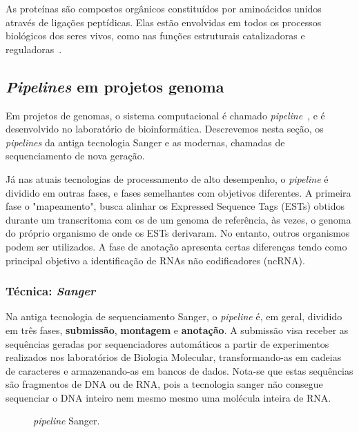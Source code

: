 As proteínas são compostos orgânicos constituídos por aminoácidos unidos através de ligações peptídicas. Elas estão envolvidas em todos os processos biológicos dos seres vivos, como nas funções estruturais catalizadoras e reguladoras~\citep{liu:2006}.


\subsection{\textit{Pipelines} em projetos genoma} \label{sec:pipeline}

Em projetos de genomas, o sistema computacional é chamado \textit{pipeline}~\citep{Lemos:2004}, e é desenvolvido no laboratório de bioinformática. Descrevemos nesta seção, os \textit{pipelines} da antiga tecnologia Sanger e as modernas, chamadas de sequenciamento de nova geração.

    Já nas atuais tecnologias de processamento de alto desempenho, o \textit{pipeline} é dividido em outras fases, e fases semelhantes com objetivos diferentes.  A primeira fase o "mapeamento", busca alinhar os Expressed Sequence Tags (ESTs) obtidos durante um transcritoma com os de um genoma de referência, às vezes, o genoma do próprio organismo de onde os ESTs derivaram. No entanto, outros organismos podem ser utilizados. A fase de anotação apresenta certas diferenças tendo como principal objetivo  a identificação de RNAs não codificadores (ncRNA).


\subsubsection{Técnica: \textit{Sanger}}

Na antiga tecnologia de sequenciamento Sanger, o \textit{pipeline} é, em geral, dividido em três fases, \textbf{submissão}, \textbf{montagem} e \textbf{anotação}. A submissão visa receber as sequências geradas por sequenciadores automáticos a partir de experimentos realizados nos laboratórios de Biologia Molecular, transformando-as em cadeias de caracteres e armazenando-as em bancos de dados. Nota-se que estas sequências são fragmentos de DNA ou de RNA, pois a tecnologia sanger não consegue sequenciar o DNA inteiro nem mesmo mesmo uma molécula inteira de RNA.


\begin{figure} [htb!]
\centering
{}
\caption{\textit{pipeline} Sanger. \label{fig:pipeline-Sange}}
\end{figure}

